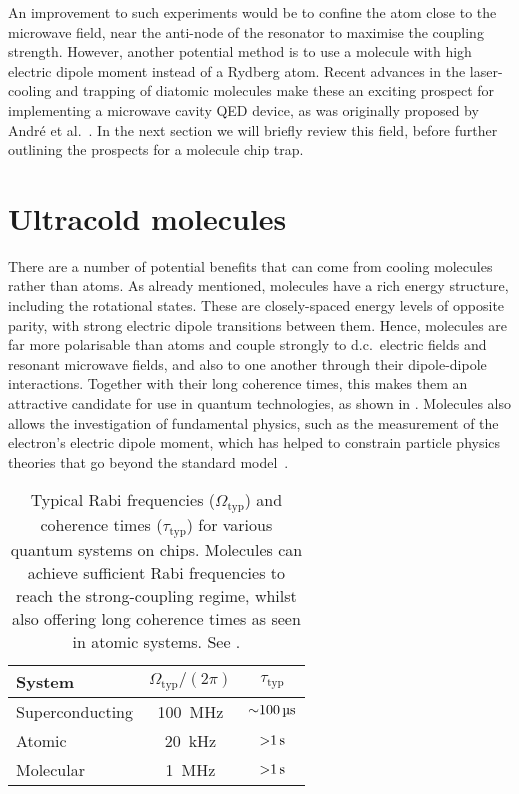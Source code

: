 An improvement to such experiments would be to confine the atom close to the
microwave field, near the anti-node of the resonator to maximise the coupling
strength. However, another potential method is to use a molecule with high
electric dipole moment instead of a Rydberg atom. Recent advances in the
laser-cooling and trapping of diatomic molecules make these an exciting
prospect for implementing a microwave cavity QED device, as was originally
proposed by Andr\'e et al.~\cite{Andre2006}. In the next section we will
briefly review this field, before further outlining the prospects for a
molecule chip trap.

\section{Ultracold molecules}

There are a number of potential benefits that can come from cooling molecules
rather than atoms. As already mentioned, molecules have a rich energy
structure, including the rotational states. These are closely-spaced energy
levels of opposite parity, with strong electric dipole transitions between
them. Hence, molecules are far more polarisable than atoms and couple strongly
to d.c.\ electric fields and resonant microwave fields, and also to one another
through their dipole-dipole interactions. Together with their long coherence
times, this makes them an attractive candidate for use in quantum
technologies, as shown in .
%
Molecules also allows the investigation of fundamental physics, such as the
measurement of the electron's electric dipole moment, which has helped to
constrain particle physics theories that go beyond the standard
model~\cite{ACMEreview}.

\begin{table}
  \centering
\begin{tabular}{lcc}
  \hline\hline
  System & $\Omega_\text{typ}/(2\pi)$ & $\tau_\text{typ}$ \\
  \hline
  Superconducting & \SI{100}{\mega\hertz} & $\SI{\sim100}{\micro\second}$ \\
  Atomic & \SI{20}{\kilo\hertz} & $\SI{>1}{\second}$ \\
  Molecular & \SI{1}{\mega\hertz} & $\SI{>1}{\second}$ \\
 \hline
\end{tabular}
  \caption[Typical properties of various on-chip systems]{
    Typical Rabi frequencies ($\Omega_\text{typ}$) and coherence times
    ($\tau_\text{typ}$) for various quantum systems on chips. Molecules can
    achieve sufficient Rabi frequencies to reach the strong-coupling regime,
    whilst also offering long coherence times as seen in atomic systems. 
    See .
  }
  \label{intro:table:typicals}
\end{table}

